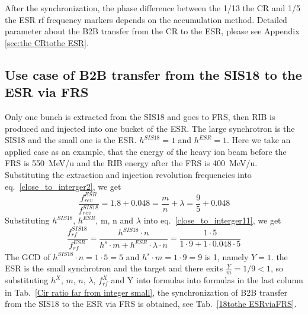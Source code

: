 After the synchronization, the phase difference between the 1/13 the CR and 1/5 the ESR rf frequency markers depends on the accumulation method. Detailed parameter about the B2B transfer from the CR to the ESR, please see Appendix \ref{sec:the CRtothe ESR}. 
\subsection{Use case of B2B transfer from the SIS18 to the ESR via FRS} 
Only one bunch is extracted from the SIS18 and goes to FRS, then RIB is produced and injected into one bucket of the ESR. The large synchrotron is the SIS18 and the small one is the ESR. $h^{\mathit{SIS18}}=1$ and $h^{\mathit{ESR}}=1$. Here we take an applied case as an example, that the energy of the heavy ion beam before the FRS is \SI{550}{MeV/\atomicmassunit} and the RIB energy after the FRS is \SI{400}{MeV/\atomicmassunit}. Substituting the extraction and injection revolution frequencies into eq.~\ref{close_to_interger2}, we get
\begin{equation} 
\frac{f_{\mathit{rev}}^{\mathit{ESR}}}{f_{\mathit{rev}}^{\mathit{SIS18}}}=1.8+0.048=\frac{m}{n}+ \lambda=\frac{9}{5}+0.048
\end{equation}
Substituting $h^{\mathit{SIS18}}$, $h^{\mathit{ESR}}$, m, n and $\lambda$ into eq.~\ref{close_to_interger11}, we get
\begin{equation}
\frac{f_{\mathit{rf}}^{\mathit{SIS18}}}{f_{\mathit{rf}}^{\mathit{ESR}}}=\frac{h^{\mathit{SIS18}}\cdot n}{h^s \cdot m+ h^{\mathit{ESR}} \cdot\lambda\cdot n}=\frac{1\cdot 5}{1 \cdot 9+1 \cdot0.048\cdot 5}
\end{equation}
The GCD of $h^{\mathit{SIS18}}\cdot n=1\cdot5=5$ and $h^s \cdot m=1\cdot 9=9$ is 1, namely $Y=1$. the ESR is the small synchrotron and the target and there exits $\frac{Y}{m}=1/9<1$, so substituting $h^X$, $m$, $n$, $\lambda$, $f_{\mathit{rf}}^{X}$ and Y into formulas into formulas in the last column in Tab.~\ref{Cir ratio far from integer small}, the synchronization of B2B transfer from the SIS18 to the ESR via FRS is obtained, see Tab.~\ref{18tothe ESRviaFRS}.
